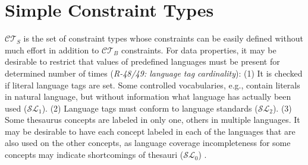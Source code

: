 \documentclass{llncs}
\newcommand{\ms}[1]{\texttt{#1}}
\begin{document}
{{	%
%

\section{Simple Constraint Types}

$\mathcal{CT}_{S}$ is the set of constraint types whose constraints can be easily defined without much effort in addition to $\mathcal{CT}_{B}$ constraints.
For data properties, it may be desirable to restrict that values of predefined languages must be present for determined number of times (\emph{R-48/49: language tag cardinality}):
(1) It is checked if literal language tags are set. Some controlled vocabularies, e.g., contain literals in natural language, but without information what language has actually been used ($\mathcal{SL}_{1}$). 
(2) Language tags must conform to language standards ($\mathcal{SL}_{2}$). 
(3) Some thesaurus concepts are labeled in only one, others in multiple languages. 
It may be desirable to have each concept labeled in each of the languages that are also used on the other concepts,
as language coverage incompleteness for some concepts may indicate shortcomings of thesauri ($\mathcal{SL}_{0}$)
\cite{MaderHaslhoferIsaac2012}.

}}
\end{document}
